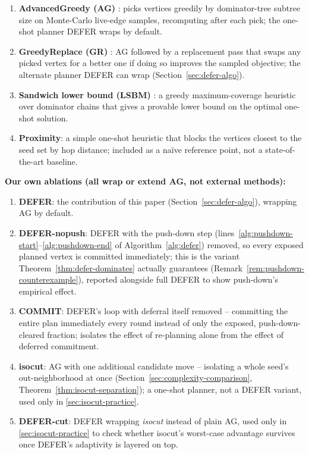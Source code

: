 \documentclass[preprint,11pt]{elsarticle}
\theoremstyle{definition}
\theoremstyle{remark}
\begin{document}
\begin{enumerate}
\item \textbf{AdvancedGreedy (AG)} \citep{xie2023,xie2024}: picks vertices
  greedily by dominator-tree subtree size on Monte-Carlo live-edge
  samples, recomputing after each pick; the one-shot planner DEFER wraps
  by default.
\item \textbf{GreedyReplace (GR)} \citep{xie2023,xie2024}: AG followed by a
  replacement pass that swaps any picked vertex for a better one if doing
  so improves the sampled objective; the alternate planner DEFER can wrap
  (Section~\ref{sec:defer-algo}).
\item \textbf{Sandwich lower bound (LSBM)} \citep{wang2024sandwich}: a
  greedy maximum-coverage heuristic over dominator chains that gives a
  provable lower bound on the optimal one-shot solution.
\item \textbf{Proximity}: a simple one-shot heuristic that blocks the
  vertices closest to the seed set by hop distance; included as a
  na\"ive reference point, not a state-of-the-art baseline.
\end{enumerate}

\noindent\textbf{Our own ablations (all wrap or extend AG, not external
methods):}

\begin{enumerate}
\item \textbf{DEFER}: the contribution of this paper (Section~\ref{sec:defer-algo}),
  wrapping AG by default.
\item \textbf{DEFER-nopush}: DEFER with the push-down step
  (lines~\ref{alg:pushdown-start}--\ref{alg:pushdown-end} of
  Algorithm~\ref{alg:defer}) removed, so every exposed planned vertex is
  committed immediately; this is the variant Theorem~\ref{thm:defer-dominates}
  actually guarantees (Remark~\ref{rem:pushdown-counterexample}), reported
  alongside full DEFER to show push-down's empirical effect.
\item \textbf{COMMIT}: DEFER's loop with deferral itself removed --
  committing the entire plan immediately every round instead of only the
  exposed, push-down-cleared fraction; isolates the effect of re-planning
  alone from the effect of deferred commitment.
\item \textbf{isocut}: AG with one additional candidate move -- isolating
  a whole seed's out-neighborhood at once
  (Section~\ref{sec:complexity-comparison}, Theorem~\ref{thm:isocut-separation});
  a one-shot planner, not a DEFER variant, used only in
  \ref{sec:isocut-practice}.
\item \textbf{DEFER-cut}: DEFER wrapping \emph{isocut} instead of plain
  AG, used only in \ref{sec:isocut-practice} to check
  whether isocut's worst-case advantage survives once DEFER's adaptivity
  is layered on top.
\end{enumerate}
\end{document}
